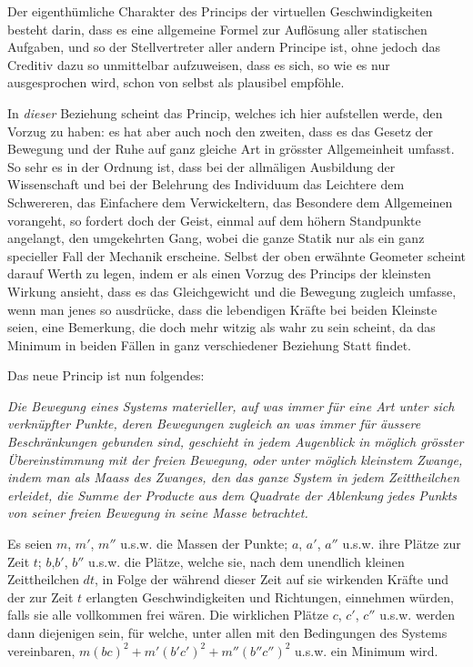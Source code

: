 \documentclass[14pt]{memoir}
\theoremstyle{plain}
\theoremstyle{remark}
\begin{document}
Der eigenthümliche Charakter des Princips der virtuellen Geschwindigkeiten besteht darin, dass es eine allgemeine Formel zur Auflösung aller statischen Aufgaben, und so der Stellvertreter aller andern Principe ist, ohne jedoch das Creditiv dazu so unmittelbar aufzuweisen, dass es sich, so wie es nur ausgesprochen wird, schon von selbst als plausibel empföhle. 

In \textit{dieser} Beziehung scheint das Princip, welches ich hier aufstellen werde, den Vorzug zu haben: es hat aber auch noch den zweiten, dass es das Gesetz der Bewegung und der Ruhe auf ganz gleiche Art in grösster Allgemeinheit umfasst. So sehr es in der Ordnung ist, dass bei der allmäligen Ausbildung der Wissenschaft und bei der Belehrung des Individuum das Leichtere dem Schwereren, das Einfachere dem Verwickeltern, das Besondere dem Allgemeinen vorangeht, so fordert doch der Geist, einmal auf dem höhern Standpunkte angelangt, den umgekehrten Gang, wobei die ganze Statik nur als ein ganz specieller Fall der Mechanik erscheine. Selbst der oben erwähnte Geometer scheint darauf Werth zu legen, indem er als einen Vorzug des Princips der kleinsten Wirkung ansieht, dass es das Gleichgewicht und die Bewegung zugleich umfasse, wenn man jenes so ausdrücke, dass die lebendigen Kräfte bei beiden Kleinste seien, eine Bemerkung, die doch mehr witzig als wahr zu sein scheint, da das Minimum in beiden Fällen in ganz verschiedener Beziehung Statt findet. 

Das neue Princip ist nun folgendes:

\textit{Die Bewegung eines Systems materieller, auf was immer für eine Art unter sich verknüpfter Punkte, deren Bewegungen zugleich an was immer für äussere Beschränkungen gebunden sind, geschieht in jedem Augenblick in möglich grösster Übereinstimmung mit der freien Bewegung, oder unter möglich kleinstem Zwange, indem man als Maass des Zwanges, den das ganze System in jedem Zeittheilchen erleidet, die 
Summe der Producte aus dem Quadrate der Ablenkung jedes Punkts von seiner freien Bewegung in seine Masse betrachtet.}

Es seien \(m\), \(m'\), \(m''\) u.s.w. die Massen der Punkte; \(a\), \(a'\), \(a''\) u.s.w. ihre Plätze zur Zeit \(t\); \(b\),\(b'\), \(b''\) u.s.w. die Plätze, welche sie, nach dem unendlich %
kleinen Zeittheilchen \(dt\), in Folge der während dieser Zeit auf sie wirkenden Kräfte und der zur Zeit \(t\) erlangten Geschwindigkeiten und Richtungen, einnehmen würden, falls sie alle vollkommen frei wären. Die wirklichen Plätze \(c\), \(c'\), \(c''\) u.s.w. werden dann diejenigen sein, für welche, unter allen mit den Bedingungen des Systems vereinbaren, \(m(bc)^2 + m'(b'c')^2+m''(b''c'')^2\) u.s.w. ein Minimum wird. 
\end{document}
